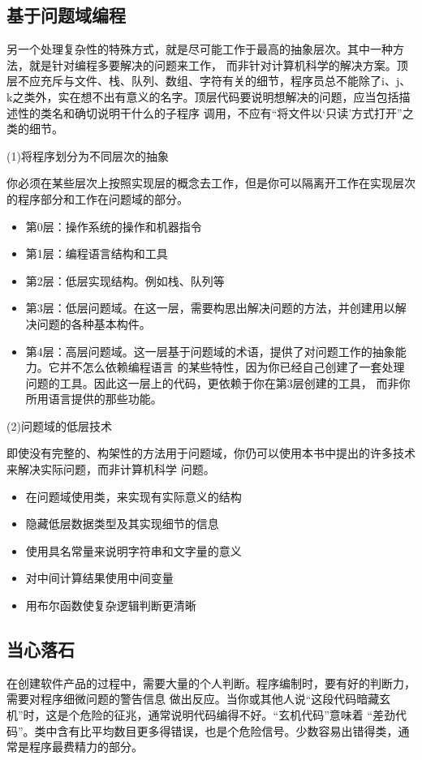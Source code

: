 \documentclass{article}
\begin{document}
\subsection{基于问题域编程}
另一个处理复杂性的特殊方式，就是尽可能工作于最高的抽象层次。其中一种方法，就是针对编程多要解决的问题来工作，
而非针对计算机科学的解决方案。顶层不应充斥与文件、栈、队列、数组、字符有关的细节，程序员总不能除了i、j、
k之类外，实在想不出有意义的名字。顶层代码要说明想解决的问题，应当包括描述性的类名和确切说明干什么的子程序
调用，不应有“将文件以‘只读’方式打开”之类的细节。
\par
(1)将程序划分为不同层次的抽象
\par
你必须在某些层次上按照实现层的概念去工作，但是你可以隔离开工作在实现层次的程序部分和工作在问题域的部分。
\begin{itemize}
    \item 第0层：操作系统的操作和机器指令
    \item 第1层：编程语言结构和工具
    \item 第2层：低层实现结构。例如栈、队列等
    \item 第3层：低层问题域。在这一层，需要构思出解决问题的方法，并创建用以解决问题的各种基本构件。
    \item 第4层：高层问题域。这一层基于问题域的术语，提供了对问题工作的抽象能力。它并不怎么依赖编程语言
    的某些特性，因为你已经自己创建了一套处理问题的工具。因此这一层上的代码，更依赖于你在第3层创建的工具，
    而非你所用语言提供的那些功能。
\end{itemize}

\par
(2)问题域的低层技术
\par
即使没有完整的、构架性的方法用于问题域，你仍可以使用本书中提出的许多技术来解决实际问题，而非计算机科学
问题。
\begin{itemize}
    \item 在问题域使用类，来实现有实际意义的结构
    \item 隐藏低层数据类型及其实现细节的信息
    \item 使用具名常量来说明字符串和文字量的意义
    \item 对中间计算结果使用中间变量
    \item 用布尔函数使复杂逻辑判断更清晰
\end{itemize}

\subsection{当心落石}
在创建软件产品的过程中，需要大量的个人判断。程序编制时，要有好的判断力，需要对程序细微问题的警告信息
做出反应。当你或其他人说“这段代码暗藏玄机”时，这是个危险的征兆，通常说明代码编得不好。“玄机代码”意味着
“差劲代码”。类中含有比平均数目更多得错误，也是个危险信号。少数容易出错得类，通常是程序最费精力的部分。
\end{document}

